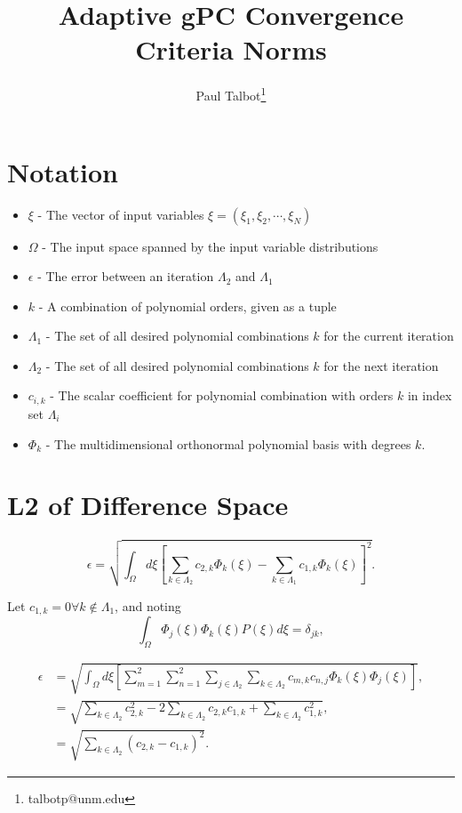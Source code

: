 \documentclass[11pt]{article}
\begin{document}
\title{Adaptive gPC Convergence Criteria Norms}

\author[]{Paul Talbot\thanks{talbotp@unm.edu}}
\date{}
\renewcommand\Authands{ and }
\maketitle
\section{Notation}
\begin{itemize}
\item $\xi$ - The vector of input variables $\xi=(\xi_1,\xi_2,\cdots,\xi_N)$
\item $\Omega$ - The input space spanned by the input variable distributions
\item $\epsilon$ - The error between an iteration $\Lambda_2$ and $\Lambda_1$
\item $k$ - A combination of polynomial orders, given as a tuple
\item $\Lambda_1$ - The set of all desired polynomial combinations $k$ for the current iteration
\item $\Lambda_2$ - The set of all desired polynomial combinations $k$ for the next iteration
\item $c_{i,k}$ - The scalar coefficient for polynomial combination with orders $k$ in index set $\Lambda_i$
\item $\Phi_k$ - The multidimensional orthonormal polynomial basis with degrees $k$.
\end{itemize}
\section{L2 of Difference Space}
\begin{equation}
\epsilon = \sqrt{\int_\Omega d\xi \left[ \sum_{k\in\Lambda_2} c_{2,k}\Phi_k(\xi) - \sum_{k\in\Lambda_1} c_{1,k}\Phi_k(\xi) \right]^2}.
\end{equation}

Let $c_{1,k}=0\forall k\notin\Lambda_1$, and noting
\begin{equation}
\int_\Omega \Phi_j(\xi)\Phi_k(\xi)P(\xi) d\xi = \delta_{jk},
\end{equation}

\begin{align}
\epsilon &= \sqrt{\int_\Omega d\xi \left[ 
     \sum_{m=1}^2\sum_{n=1}^2\sum_{j\in\Lambda_2}\sum_{k\in\Lambda_2}c_{m,k}c_{n,j}\Phi_k(\xi)\Phi_j(\xi)
    \right]},\\
  &= \sqrt{\sum_{k\in\Lambda_2} c^2_{2,k} -2 \sum_{k\in\Lambda_2}c_{2,k}c_{1,k} + \sum_{k\in\Lambda_2}c_{1,k}^2}, \\
  &= \sqrt{\sum_{k\in\Lambda_2}(c_{2,k}-c_{1,k})^2}.
\end{align}
\end{document}

